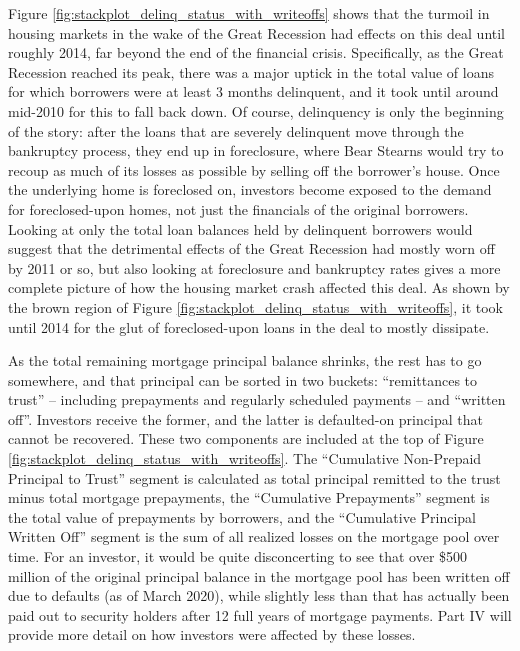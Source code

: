 \documentclass[12pt]{article}
\begin{document}
Figure \ref{fig:stackplot_delinq_status_with_writeoffs} shows that the turmoil in housing markets in the wake of the Great Recession had effects on this deal until roughly 2014, far beyond the end of the financial crisis. Specifically, as the Great Recession reached its peak, there was a major uptick in the total value of loans for which borrowers were at least 3 months delinquent, and it took until around mid-2010 for this to fall back down. Of course, delinquency is only the beginning of the story: after the loans that are severely delinquent move through the bankruptcy process, they end up in foreclosure, where Bear Stearns would try to recoup as much of its losses as possible by selling off the borrower’s house. Once the underlying home is foreclosed on, investors become exposed to the demand for foreclosed-upon homes, not just the financials of the original borrowers. Looking at only the total loan balances held by delinquent borrowers would suggest that the detrimental effects of the Great Recession had mostly worn off by 2011 or so, but also looking at foreclosure and bankruptcy rates gives a more complete picture of how the housing market crash affected this deal. As shown by the brown region of Figure \ref{fig:stackplot_delinq_status_with_writeoffs}, it took until 2014 for the glut of foreclosed-upon loans in the deal to mostly dissipate.

	As the total remaining mortgage principal balance shrinks, the rest has to go somewhere, and that principal can be sorted in two buckets: “remittances to trust” – including prepayments and regularly scheduled payments – and “written off”. Investors receive the former, and the latter is defaulted-on principal that cannot be recovered. These two components are included at the top of Figure \ref{fig:stackplot_delinq_status_with_writeoffs}. The “Cumulative Non-Prepaid Principal to Trust” segment is calculated as total principal remitted to the trust minus total mortgage prepayments, the “Cumulative Prepayments” segment is the total value of prepayments by borrowers, and the “Cumulative Principal Written Off” segment is the sum of all realized losses on the mortgage pool over time. For an investor, it would be quite disconcerting to see that over \$500 million of the original principal balance in the mortgage pool has been written off due to defaults (as of March 2020), while slightly less than that has actually been paid out to security holders after 12 full years of mortgage payments. Part IV will provide more detail on how investors were affected by these losses.
\end{document}

